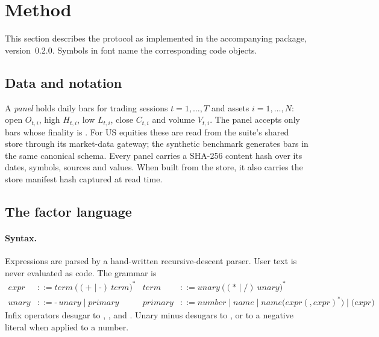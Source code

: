 \section{Method}
\label{sec:method}

This section describes the protocol as implemented in the accompanying
package, version~0.2.0. Symbols in  font name the
corresponding code objects.

\subsection{Data and notation}
\label{sec:data}

A \emph{panel} holds daily bars for trading sessions $t=1,\dots,T$ and assets
$i=1,\dots,N$: open $O_{t,i}$, high $H_{t,i}$, low $L_{t,i}$, close $C_{t,i}$
and volume $V_{t,i}$. The panel accepts only bars whose finality is
. For US equities these are read from the suite's shared
store through its market-data gateway; the synthetic benchmark generates bars
in the same canonical schema. Every panel carries a SHA-256 content hash over
its dates, symbols, sources and values. When built from the store, it also
carries the store manifest hash captured at read time.

\subsection{The factor language}
\label{sec:dsl}

\paragraph{Syntax.} Expressions are parsed by a hand-written recursive-descent
parser. User text is never evaluated as code. The grammar is
\begin{align*}
\mathit{expr} &::= \mathit{term}\ \big((\texttt{+}\mid\texttt{-})\ \mathit{term}\big)^{*} &
\mathit{term} &::= \mathit{unary}\ \big((\texttt{*}\mid\texttt{/})\ \mathit{unary}\big)^{*}\\
\mathit{unary} &::= \texttt{-}\,\mathit{unary} \mid \mathit{primary} &
\mathit{primary} &::= \mathit{number} \mid \mathit{name} \mid \mathit{name}\texttt{(}\mathit{expr}(\texttt{,}\,\mathit{expr})^{*}\texttt{)} \mid \texttt{(}\mathit{expr}\texttt{)}
\end{align*}
Infix operators desugar to , ,  and
. Unary minus desugars to , or to a negative literal when
applied to a number.

